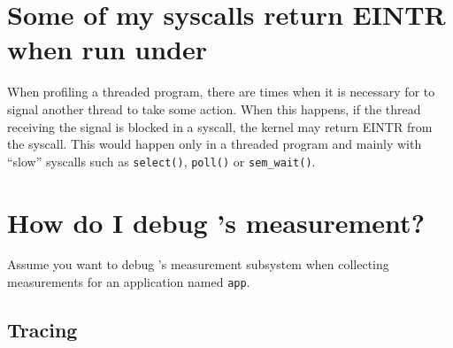 \documentclass[11pt,letterpaper]{report}
\begin{document}

\section{Some of my syscalls return EINTR when run under \hpcrun{}}

When profiling a threaded program, there are times when it is
necessary for \hpcrun{} to signal another thread to take some action.
When this happens, if the thread receiving the signal is blocked in a
syscall, the kernel may return EINTR from the syscall.  This would
happen only in a threaded program and mainly with ``slow'' syscalls
such as {\tt select()}, {\tt poll()} or {\tt sem\_wait()}.



\section{How do I debug \HPCToolkit{}'s measurement?}

Assume you want to debug \HPCToolkit{}'s measurement subsystem when
collecting measurements for an application named \texttt{app}.


\subsection{Tracing \libmonitor{}}
\end{document}
